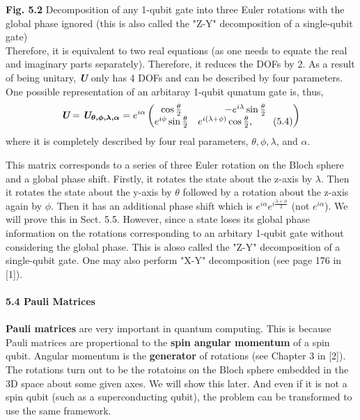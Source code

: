 \documentclass{article}
\newcommand{\bfit}[1]{\textit{\textbf{#1}}}
\begin{document}
\textbf{Fig. 5.2} Decomposition of any 1-qubit gate into three Euler rotations with the global phase
ignored (this is also called the "Z-Y" decomposition of a single-qubit gate)
\\
Therefore, it is equivalent to two real equations (as one needs to equate the real and imaginary
parts separately). Therefore, it reduces the DOFs by 2. As a result of being
unitary, \bfit{U} only has 4 DOFs and can be described by four parameters.
One possible representation of an arbitaray 1-qubit qunatum gate is, thus,
\begin{equation}\label{eq 5.4}
    \bfit{U}=\bfit{U}_{\boldsymbol{\theta,\phi,\lambda,\alpha}}=e^{i\alpha}\begin{pmatrix}
        \cos{\frac{\theta}{2}} & -e^{i\lambda}\sin{\frac{\theta}{2}}\\
        e^{i\phi}\sin{\frac{\theta}{2}} & e^{i(\lambda+\phi)}\cos{\frac{\theta}{2}}, \tag{5.4}
    \end{pmatrix}
\end{equation}
where it is completely described by four real parameters, $\theta, \phi, \lambda$, and $\alpha$.

This matrix corresponds to a series of three Euler rotation on the Bloch sphere and a global phase shift.
Firstly, it rotates the state about the z-axis by $\lambda$. Then it rotates
the state about the y-axis by $\theta$ followed by a rotation about the z-axis
again by $\phi$. Then it has an additional phase shift which is $e^{i\alpha}e^{i\frac{\lambda+\phi}{2}}$ (not $e^{i\alpha}$).
We will prove this in Sect. 5.5. However, since a state loses its global phase information on the
rotations corresponding to an arbitary 1-qubit gate without considering the global
phase. This is aloso called the "Z-Y" decomposition of a single-qubit gate. One may 
also perform "X-Y" decomposition (see page 176 in [1]).\\\\
\textbf{\large 5.4 Pauli Matrices}\\\\
\textbf{Pauli matrices} are very important in quantum computing. This is because Pauli
matrices are propertional to the \textbf{spin angular momentum} of a spin qubit.
Angular momentum is the \textbf{generator} of rotations (see Chapter 3 in [2]). 
The rotations turn out to be the rotatoins on the Bloch sphere embedded in the 
3D space about some given axes. We will show this later. And even if it is not a spin
qubit (such as a superconducting qubit), the problem can be transformed to use the same
framework.
\end{document}
